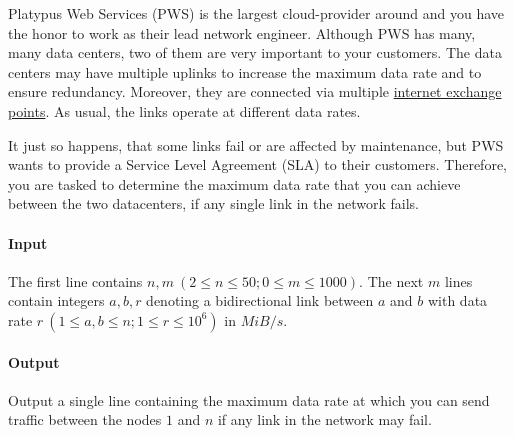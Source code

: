 



\makeheader

Platypus Web Services (PWS) is the largest cloud-provider around and you have the honor to work as their lead network engineer.
Although PWS has many, many data centers, two of them are very important to your customers.
The data centers may have multiple uplinks to increase the maximum data rate and to ensure redundancy.
Moreover, they are connected via multiple \href{https://en.wikipedia.org/wiki/Internet_exchange_point}{internet exchange points}.
As usual, the links operate at different data rates.

It just so happens, that some links fail or are affected by maintenance, but PWS wants to provide a Service Level Agreement (SLA) to their customers.
Therefore, you are tasked to determine the maximum data rate that you can achieve between the two datacenters, if any single link in the network fails.

\paragraph*{Input}

The first line contains $n, m ~ (2 \leq n \leq 50; 0 \leq m \leq 1000)$. The next $m$ lines
contain integers $a, b, r$ denoting a bidirectional link between $a$ and $b$ with data rate $r ~ (1 \leq a, b \leq n;
1 \leq r \leq 10^6)$ in $MiB / s$.

\paragraph*{Output}

Output a single line containing the maximum data rate at which you can send traffic between the nodes $1$ and $n$
if any link in the network may fail.

\begin{samples}
\end{samples}


